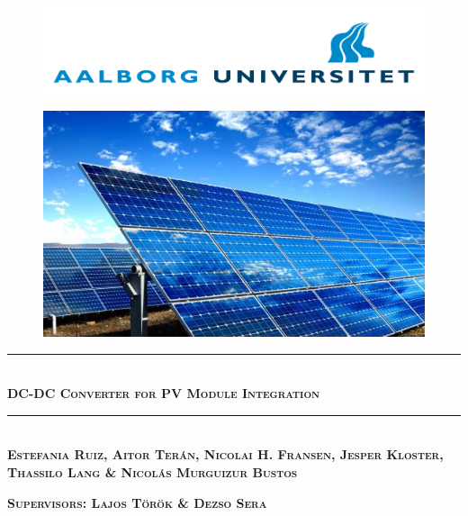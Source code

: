 
\usepackage[export]{adjustbox}

\newcommand\tab[1][1cm]{\hspace*{#1}}


	
\begin{titlingpage}

	
\newcommand{\HRule}{\rule{\linewidth}{0.1mm}} %

\vspace*{-2cm}
\begin{figure}[htbp]
	\begin{center}
		\includegraphics[width=\textwidth]{../Pictures/AAU_logo}
		\label{aau_logo}
	\end{center}	
\end{figure}

\vspace*{2cm}
\begin{figure}[htbp]
	\begin{center}
		\includegraphics[width=\textwidth]{../Pictures/frontpage_pvpanel.png}
		\cite{frontpage_pic}
		\label{frontpage}
	\end{center}	
\end{figure}

\begin{center}
\vspace*{0.5cm}
\HRule \\[0.8cm]
{\huge \bfseries \textsc{DC-DC Converter for PV Module Integration}}\\[0.2cm]
\HRule \\[1.5cm]

\textsc{\textbf{Estefania Ruiz, Aitor Terán, Nicolai H. Fransen, Jesper Kloster, Thassilo Lang \& Nicolás Murguizur Bustos}}


\vspace*{1cm}
\textsc{\textbf{Supervisors: Lajos Török \& Dezso Sera}}
\end{center}
\end{titlingpage}

